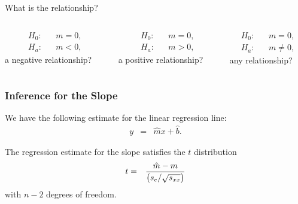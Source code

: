 \begin{frame}{What is the relationship?}


    \begin{columns}
      \begin{column}{.33\textwidth}
        \begin{eqnarray*}
          H_0: & & m=0, \\
          H_a: & & m<0,
        \end{eqnarray*}
        a negative relationship?

        \vfill
      \end{column}
      \vrule{}

      \begin{column}{.33\textwidth}
        \begin{eqnarray*}
          H_0: & & m=0, \\
          H_a: & & m>0,
        \end{eqnarray*}
        a positive relationship?

        \vfill
      \end{column}
      \vrule{}

      \begin{column}{.33\textwidth}
        \begin{eqnarray*}
          H_0: & & m=0, \\
          H_a: & & m\neq 0,
        \end{eqnarray*}
        any relationship?

        \vfill
      \end{column}
      \vrule{}
      
    \end{columns}

  
\end{frame}

\begin{frame}
  \frametitle{Inference for the Slope}

  We have the following estimate for the linear regression line:
  \begin{eqnarray*}
    y & = & \hat{m} x + \hat{b}.
  \end{eqnarray*}

  \begin{definition}
    The regression estimate for the slope satisfies the $t$ distribution
    \begin{eqnarray*}
      t & = & \frac{\hat{m}-m}{\left( s_e/\sqrt{s_{xx}} \right)}
    \end{eqnarray*}
    with $n-2$ degrees of freedom.
  \end{definition}


\end{frame}

